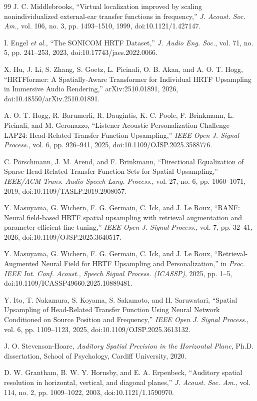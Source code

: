 \documentclass[journal]{IEEEtran}
\begin{document}
\begin{thebibliography}{99}
J. C. Middlebrooks, ``Virtual localization improved by scaling nonindividualized external-ear transfer functions in frequency,'' \textit{J. Acoust. Soc. Am.}, vol. 106, no. 3, pp. 1493--1510, 1999, doi:10.1121/1.427147.

I. Engel \textit{et al.}, ``The SONICOM HRTF Dataset,'' \textit{J. Audio Eng. Soc.}, vol. 71, no. 5, pp. 241--253, 2023, doi:10.17743/jaes.2022.0066.

X. Hu, J. Li, S. Zhang, S. Goetz, L. Picinali, O. B. Akan, and A. O. T. Hogg,
``HRTFformer: A Spatially-Aware Transformer for Individual HRTF Upsampling in Immersive Audio Rendering,''
arXiv:2510.01891, 2026, doi:10.48550/arXiv.2510.01891.

A. O. T. Hogg, R. Barumerli, R. Daugintis, K. C. Poole, F. Brinkmann, L. Picinali, and M. Geronazzo,
``Listener Acoustic Personalization Challenge--LAP24: Head-Related Transfer Function Upsampling,''
\textit{IEEE Open J. Signal Process.}, vol. 6, pp. 926--941, 2025, doi:10.1109/OJSP.2025.3588776.


C. P\"orschmann, J. M. Arend, and F. Brinkmann, ``Directional Equalization of Sparse Head-Related Transfer Function Sets for Spatial Upsampling,'' \textit{IEEE/ACM Trans. Audio Speech Lang. Process.}, vol. 27, no. 6, pp. 1060--1071, 2019, doi:10.1109/TASLP.2019.2908057.

Y. Masuyama, G. Wichern, F. G. Germain, C. Ick, and J. Le Roux,
``RANF: Neural field-based HRTF spatial upsampling with retrieval augmentation and parameter efficient fine-tuning,''
\textit{IEEE Open J. Signal Process.}, vol. 7, pp. 32--41, 2026, doi:10.1109/OJSP.2025.3640517.

Y. Masuyama, G. Wichern, F. G. Germain, C. Ick, and J. Le Roux,
``Retrieval-Augmented Neural Field for HRTF Upsampling and Personalization,''
in \textit{Proc. IEEE Int. Conf. Acoust., Speech Signal Process. (ICASSP)}, 2025, pp. 1--5, doi:10.1109/ICASSP49660.2025.10889481.

Y. Ito, T. Nakamura, S. Koyama, S. Sakamoto, and H. Saruwatari,
``Spatial Upsampling of Head-Related Transfer Function Using Neural Network Conditioned on Source Position and Frequency,''
\textit{IEEE Open J. Signal Process.}, vol. 6, pp. 1109--1123, 2025, doi:10.1109/OJSP.2025.3613132.

J. O. Stevenson-Hoare, \textit{Auditory Spatial Precision in the Horizontal Plane}, Ph.D. dissertation, School of Psychology, Cardiff University, 2020.

D. W. Grantham, B. W. Y. Hornsby, and E. A. Erpenbeck, ``Auditory spatial resolution in horizontal, vertical, and diagonal planes,'' \textit{J. Acoust. Soc. Am.}, vol. 114, no. 2, pp. 1009--1022, 2003, doi:10.1121/1.1590970.

\end{thebibliography}
\endgroup
\end{document}
